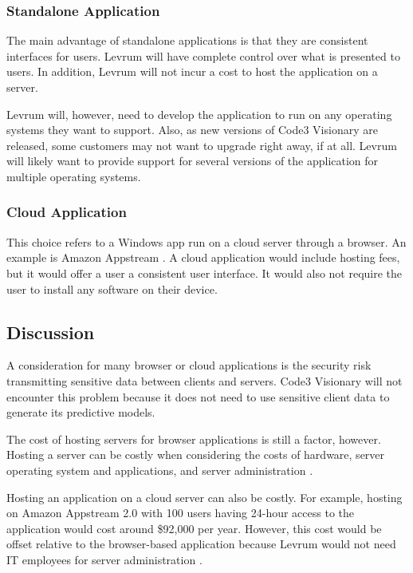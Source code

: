 \documentclass[onecolumn, draftclsnofoot,10pt, compsoc]{IEEEtran}
\begin{document}
        \subsubsection{Standalone Application}
        The main advantage of standalone applications is that they are consistent interfaces for users.
        Levrum will have complete control over what is presented to users.
        In addition, Levrum will not incur a cost to host the application on a server. 
        
        Levrum will, however, need to develop the application to run on any operating systems they want to support. Also, as new versions of Code3 Visionary are released, some customers may not want to upgrade right away, if at all. Levrum will likely want to provide support for several versions of the application for multiple operating systems.
        
        \subsubsection{Cloud Application}
        This choice refers to a Windows app run on a cloud server through a browser.
        An example is Amazon Appstream \cite{AmznAppStream}.
        A cloud application would include hosting fees, but it would offer a user a consistent user interface.
        It would also not require the user to install any software on their device.
        
    \subsection{Discussion}
    A consideration for many browser or cloud applications is the security risk transmitting sensitive data between clients and servers.
    Code3 Visionary will not encounter this problem because it does not need to use sensitive client data to generate its predictive models. 
    
    The cost of hosting servers for browser applications is still a factor, however. Hosting a server can be costly when considering the costs of hardware, server operating system and applications, and server administration \cite{ServerCost}.
    
    Hosting an application on a cloud server can also be costly. For example, hosting on Amazon Appstream 2.0 with 100 users having 24-hour access to the application would cost around \$92,000 per year. However, this cost would be offset relative to the browser-based application because Levrum would not need IT employees for server administration \cite{AppstreamCost}.
    
\end{document}

